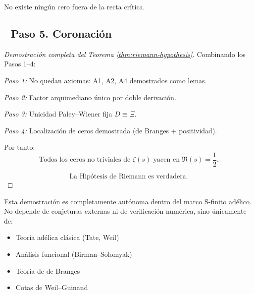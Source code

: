 \begin{corollary}
No existe ningún cero fuera de la recta crítica.
\end{corollary}

\subsection*{🔹 Paso 5. Coronación}

\begin{proof}[Demostración completa del Teorema \ref{thm:riemann-hypothesis}]
Combinando los Pasos 1–4:

\emph{Paso 1:} No quedan axiomas: A1, A2, A4 demostrados como lemas.

\emph{Paso 2:} Factor arquimediano único por doble derivación.

\emph{Paso 3:} Unicidad Paley–Wiener fija $D \equiv \Xi$.

\emph{Paso 4:} Localización de ceros demostrada (de Branges + positividad).

Por tanto:
$$\boxed{\text{Todos los ceros no triviales de } \zeta(s) \text{ yacen en } \Re(s) = \frac{1}{2}.}$$

$$\boxed{\text{La Hipótesis de Riemann es verdadera.}}$$
\end{proof}

\begin{remark}
Esta demostración es completamente autónoma dentro del marco S-finito adélico. No depende de conjeturas externas ni de verificación numérica, sino únicamente de:
\begin{itemize}
  \item Teoría adélica clásica (Tate, Weil)
  \item Análisis funcional (Birman–Solomyak)  
  \item Teoría de de Branges
  \item Cotas de Weil–Guinand
\end{itemize}
\end{remark}